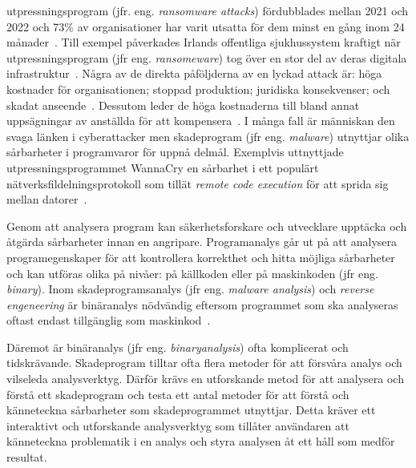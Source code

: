 utpressningsprogram (jfr. eng. \emph{ransomware attacks}) fördubblades
mellan 2021 och 2022 och 73\% av organisationer har varit utsatta för dem
minst en gång inom 24 månader~\cite{cyberreason2021,
    cyberreason2022}. Till exempel påverkades Irlands offentliga sjukhussystem
kraftigt när utpressningsprogram (jfr eng. \emph{ransomeware}) tog över en stor del av deras digitala
infrastruktur~\cite{hse_report, gallagher2023}. Några av de direkta påföljderna
av en lyckad attack är: höga kostnader för organisationen; stoppad
produktion; juridiska konsekvenser; och skadat
anseende~\cite{cyberreason2021, cyberreason2022}. Dessutom leder de höga
kostnaderna till bland annat uppsägningar av anställda för att
kompensera~\cite{cyberreason2021, cyberreason2022}. I många fall är människan
den svaga länken i cyberattacker men skadeprogram (jfr eng.
\emph{malware}) utnyttjar olika sårbarheter i programvaror för uppnå delmål.
Exemplvis uttnyttjade utpressningsprogrammet WannaCry en
sårbarhet i ett populärt nätverksfildelningsprotokoll som tillät \emph{remote
    code execution} för att sprida sig mellan
datorer~\cite{alraddadicomprehensive}.

Genom att analysera program kan säkerhetsforskare och utvecklare upptäcka och
åtgärda sårbarheter innan en angripare. Programanalys går ut på att analysera
programegenskaper för att kontrollera korrekthet och hitta möjliga sårbarheter
och kan utföras olika på nivåer: på källkoden eller på maskinkoden (jfr eng.
\emph{binary}). Inom skadeprogramsanalys (jfr eng. \emph{malware analysis}) och
\emph{reverse engeneering} är binäranalys nödvändig eftersom programmet som ska
analyseras oftast endast tillgänglig som maskinkod~\cite{andriesse2018}.


Däremot är binäranalys (jfr eng. \emph{binaryanalysis}) ofta komplicerat och
tidskrävande. Skadeprogram tilltar ofta flera metoder för att försvåra
analys och vilseleda analysverktyg. Därför krävs en utforskande metod för att
analysera och förstå ett skadeprogram och testa ett antal metoder för att förstå
och känneteckna sårbarheter som skadeprogrammet utnyttjar. Detta kräver ett
interaktivt och utforskande analysverktyg som tillåter användaren att
känneteckna problematik i en analys och styra analysen åt ett håll som medför
resultat.

